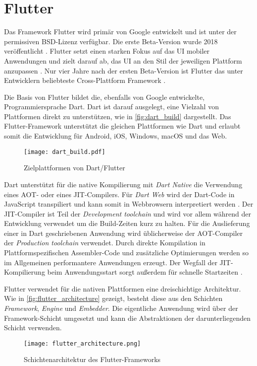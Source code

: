 \section{Flutter}
\label{sec:Frameworks_Flutter}

Das Framework Flutter wird primär von Google entwickelt und ist unter der permissiven BSD-Lizenz verfügbar.
Die erste Beta-Version wurde 2018 veröffentlicht \cite{Sharma_Flutter}.
Flutter setzt einen starken Fokus auf das \ac{UI} mobiler Anwendungen und zielt darauf ab, das \ac{UI} an den Stil der jeweiligen Plattform anzupassen \cite{Flutter_Architektur}.
Nur vier Jahre nach der ersten Beta-Version ist Flutter das unter Entwicklern beliebteste Cross-Plattform Framework \cite{Stackoverflow_2022, Sharma_Flutter}.


Die Basis von Flutter bildet die, ebenfalls von Google entwickelte, Programmiersprache Dart.
Dart ist darauf ausgelegt, eine Vielzahl von Plattformen direkt zu unterstützen, wie in \autoref{fig:dart_build} dargestellt.
Das Flutter-Framework unterstützt die gleichen Plattformen wie Dart und erlaubt somit die Entwicklung für Android, iOS, Windows, macOS und das Web.
\begin{figure}[ht]
    \centering
    \texttt{[image: dart\_build.pdf]}
    \caption{Zielplattformen von Dart/Flutter \cite{Dart_Overview}}
    \label{fig:dart_build}
\end{figure}


Dart unterstützt für die native Kompilierung mit \textit{Dart Native} die Verwendung eines \ac{AOT}- oder eines \ac{JIT}-Compilers.
Für \textit{Dart Web} wird der Dart-Code in JavaScript transpiliert und kann somit in Webbrowsern interpretiert werden \cite{Flutter_Architektur}.
Der \ac{JIT}-Compiler ist Teil der \textit{Development toolchain} und wird vor allem während der Entwicklung verwendet um die Build-Zeiten kurz zu halten.
Für die Auslieferung einer in Dart geschriebenen Anwendung wird üblicherweise der \ac{AOT}-Compiler der \textit{Production toolchain} verwendet.
Durch direkte Kompilation in Plattformspezifischen Assembler-Code und zusätzliche Optimierungen werden so im Allgemeinen performantere Anwendungen erzeugt.
Der Wegfall der \ac{JIT}-Kompilierung beim Anwendungsstart sorgt außerdem für schnelle Startzeiten \cite{Dart_Overview}.



Flutter verwendet für die nativen Plattformen eine dreischichtige Architektur.
Wie in \autoref{fig:flutter_architecture} gezeigt, besteht diese aus den Schichten \textit{Framework}, \textit{Engine} und \textit{Embedder}.
Die eigentliche Anwendung wird über der Framework-Schicht umgesetzt und kann die Abstraktionen der darunterliegenden Schicht verwenden.
\begin{figure}[h]
    \centering
    \texttt{[image: flutter\_architecture.png]}
    \caption{Schichtenarchitektur des Flutter-Frameworks \cite{Flutter_Architektur}}
    \label{fig:flutter_architecture}
\end{figure}

